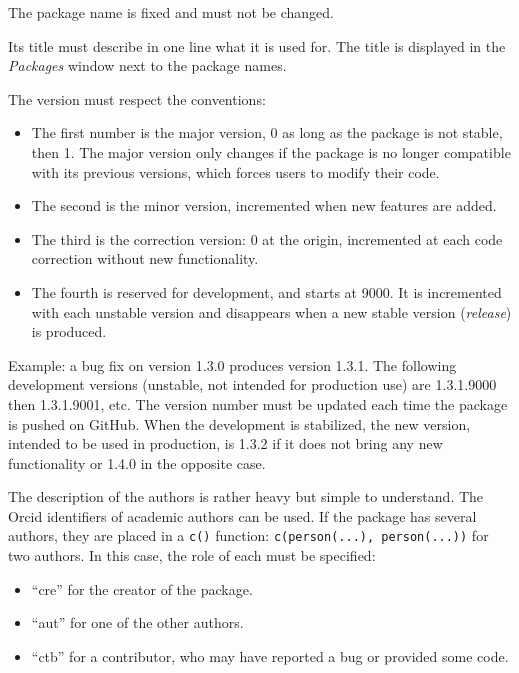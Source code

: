 \documentclass[
  12pt,
  american,
  a4paper,
  extrafontsizes,onecolumn,openright
  ]{memoir}
\providecommand{\tightlist}{%
  \setlength{\itemsep}{0pt}\setlength{\parskip}{0pt}}
\begin{document}
The package name is fixed and must not be changed.

Its title must describe in one line what it is used for.
The title is displayed in the \emph{Packages} window next to the package names.

The version must respect the conventions:

\begin{itemize}
\tightlist
\item
  The first number is the major version, 0 as long as the package is not stable, then 1.
  The major version only changes if the package is no longer compatible with its previous versions, which forces users to modify their code.
\item
  The second is the minor version, incremented when new features are added.
\item
  The third is the correction version: 0 at the origin, incremented at each code correction without new functionality.
\item
  The fourth is reserved for development, and starts at 9000.
  It is incremented with each unstable version and disappears when a new stable version (\emph{release}) is produced.
\end{itemize}

Example: a bug fix on version 1.3.0 produces version 1.3.1.
The following development versions (unstable, not intended for production use) are 1.3.1.9000 then 1.3.1.9001, etc.
The version number must be updated each time the package is pushed on GitHub.
When the development is stabilized, the new version, intended to be used in production, is 1.3.2 if it does not bring any new functionality or 1.4.0 in the opposite case.

The description of the authors is rather heavy but simple to understand.
The Orcid identifiers of academic authors can be used.
If the package has several authors, they are placed in a \texttt{c()} function: \texttt{c(person(...),\ person(...))} for two authors.
In this case, the role of each must be specified:

\begin{itemize}
\tightlist
\item
  \enquote{cre} for the creator of the package.
\item
  \enquote{aut} for one of the other authors.
\item
  \enquote{ctb} for a contributor, who may have reported a bug or provided some code.
\end{itemize}
\end{document}
